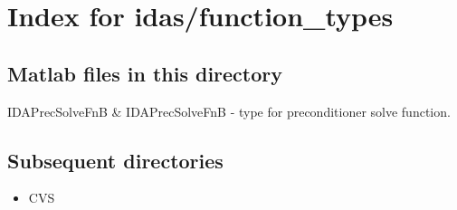 \section{Index for {\sc idas/function_types}}

\subsection{Matlab files in this directory}

\begin{tabular}

IDAPrecSolveFnB & IDAPrecSolveFnB - type for preconditioner solve function.  \\
\end{tabular}


\subsection{Subsequent directories}

\begin{itemize}


\item CVS
\end{itemize}